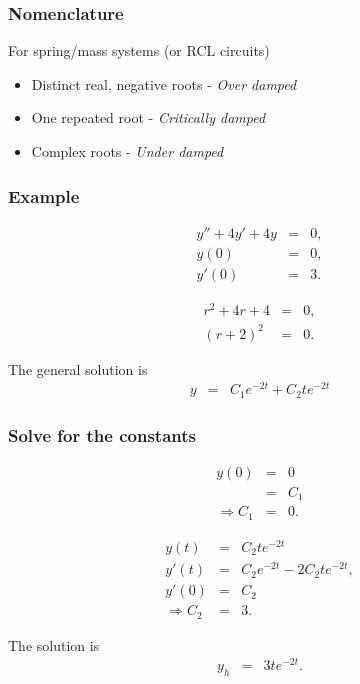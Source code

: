 \begin{frame}
  \frametitle{Nomenclature}

  For spring/mass systems (or RCL circuits)
  \begin{itemize}
  \item Distinct real, negative roots - \textit{Over damped}
  \item One repeated root - \textit{Critically damped}
  \item Complex roots   - \textit{Under damped}
  \end{itemize}

\end{frame}

\begin{frame}
  \frametitle{Example}

  \begin{eqnarray*}
    y'' + 4y' + 4y & = & 0, \\
    y(0) & = & 0, \\
    y'(0) & = & 3.
  \end{eqnarray*}

  {
    \begin{eqnarray*}
      r^2 + 4r + 4 & = & 0, \\
      (r+2)^2 & = & 0.
    \end{eqnarray*}

    The general solution is
    \begin{eqnarray*}
      y & = & C_1 e^{-2t} + C_2 t e^{-2t}
    \end{eqnarray*}

  }

\end{frame}



\begin{frame}
  \frametitle{Solve for the constants}

  \begin{eqnarray*}
    y(0) & = & 0 \\
    & = & C_1 \\
    \Rightarrow C_1 & = & 0.
  \end{eqnarray*}

  \begin{eqnarray*}
    y(t) & = & C_2 t e^{-2t} \\
    y'(t) & = & C_2 e^{-2t} - 2 C_2 t e^{-2t}, \\
    y'(0) & = & C_2 \\
    \Rightarrow C_2 & = & 3.
  \end{eqnarray*}

  The solution is
  \begin{eqnarray*}
    y_h & = & 3 t e^{-2t}.
  \end{eqnarray*}

\end{frame}

